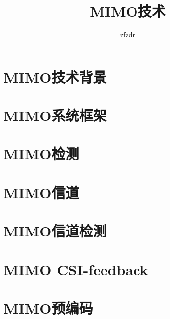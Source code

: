 \documentclass[12pt,a4paper]{ctexart}  %
\author{zfzdr}      %
\title{MIMO技术}    %
\begin{document}
\pagestyle{plain}    %
\maketitle           %
\tableofcontents     %
\section{MIMO技术背景}
\section{MIMO系统框架}
\section{MIMO检测}
\section{MIMO信道}
\section{MIMO信道检测}
\section{MIMO CSI-feedback}
\section{MIMO预编码}
\end{document}
